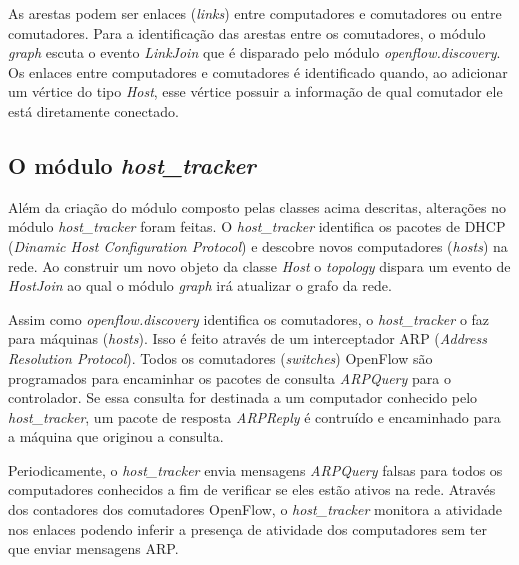 As arestas podem ser enlaces (\emph{links}) entre computadores e comutadores ou
entre comutadores.
Para a identificação das arestas entre os comutadores, o módulo \emph{graph} 
escuta o evento \emph{LinkJoin} que é disparado pelo módulo 
\emph{openflow.discovery}.
Os enlaces entre computadores e comutadores é identificado quando, ao 
adicionar um vértice do tipo \emph{Host}, esse vértice possuir a informação
de qual comutador ele está diretamente conectado.

\subsection{O módulo \emph{host\_tracker}}

Além da criação do módulo composto pelas classes acima descritas, alterações
no módulo \emph{host\_tracker} foram feitas.
O \emph{host\_tracker} identifica os pacotes de DHCP (\emph{Dinamic Host
Configuration Protocol}) e descobre novos computadores (\emph{hosts}) na rede.
Ao construir um novo objeto da classe \emph{Host} o \emph{topology} dispara
um evento de \emph{HostJoin} ao qual o módulo \emph{graph} irá atualizar
o grafo da rede.

Assim como \emph{openflow.discovery} identifica os comutadores, o 
\emph{host\_tracker} o faz para máquinas (\emph{hosts}).
Isso é feito através de um interceptador ARP (\emph{Address Resolution 
Protocol}).
Todos os comutadores (\emph{switches}) OpenFlow são programados para encaminhar
os pacotes de consulta \emph{ARPQuery} para o controlador.
Se essa consulta for destinada a um computador conhecido pelo
\emph{host\_tracker}, um pacote de resposta \emph{ARPReply} é contruído e 
encaminhado para a máquina que originou a consulta.

Periodicamente, o \emph{host\_tracker} envia mensagens \emph{ARPQuery} falsas
para todos os computadores conhecidos a fim de verificar se eles estão ativos
na rede.
Através dos contadores dos comutadores OpenFlow, o \emph{host\_tracker} 
monitora a atividade nos enlaces podendo inferir a presença de atividade
dos computadores sem ter que enviar mensagens ARP.
